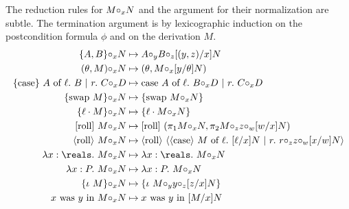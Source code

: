 \documentclass[12pt]{cmuthesis}
\theoremstyle{definition}
\theoremstyle{remark}
\newcommand{\stepsto}{\mapsto}
\begin{document}
The reduction rules for $\emon{M}{N}{x}$ and the argument for their normalization are subtle.
The termination argument is by lexicographic induction on the postcondition formula  $\phi$ and on the derivation $M$.
\begin{align*}
\emon{\eCons{A}{B}}{N}{x} &\stepsto \emon{A}{\emon{B}{\esub{N}{x}{\econs{y}{z}}}{z}}{y}\\
\emon{\etcons{\theta}{M}}{N}{x} &\stepsto \etcons{\theta}{\emon{M}{\esub{N}{\theta}{y}}{x}}\\
\emon{\eCase{A}{B}{C}}{D}{x} &\stepsto \ecase{A}{\emon{B}{D}{x}}{\emon{C}{D}{x}}\\
\emon{\eSwap{M}}{N}{x} &\stepsto \eSwap{\emon{M}{N}{x}}\\
\emon{\eInjL{M}}{N}{x}   &\stepsto \eInjL{\emon{M}{N}{x}}\\
\emon{\ebroll{M}}{N}{x}  &\stepsto \ebroll{\econs{\emon{\eprojL{M}}{N}{x}}{\emon{\eprojR{M}}{\emon{z}{\esub{N}{x}{w}}{w}}{z}}}\\
\emon{\edroll{M}}{N}{x} &\stepsto \edroll{\edcase{M}{\esub{N}{x}{\ell}}{\emon{r}{\emon{z}{\esub{N}{w}{x}}{w}}{z}}}\\
\emon{\elam{\reals}{M}}{N}{x} &\stepsto \elam{\reals}{\emon{M}{N}{x}}\\
\emon{\elam{P}{M}}{N}{x} &\stepsto \elam{P}{\emon{M}{N}{x}}\\
\emon{\eSeq{M}}{N}{x} &\stepsto \eSeq{\emon{M}{\emon{y}{\esub{N}{x}{z}}{z}}{y}}\\
\emon{\easgneq{x}{y}{M}}{N}{x} &\stepsto \easgneq{x}{y}{\esub{N}{x}{M}}
\end{align*}
\end{document}
